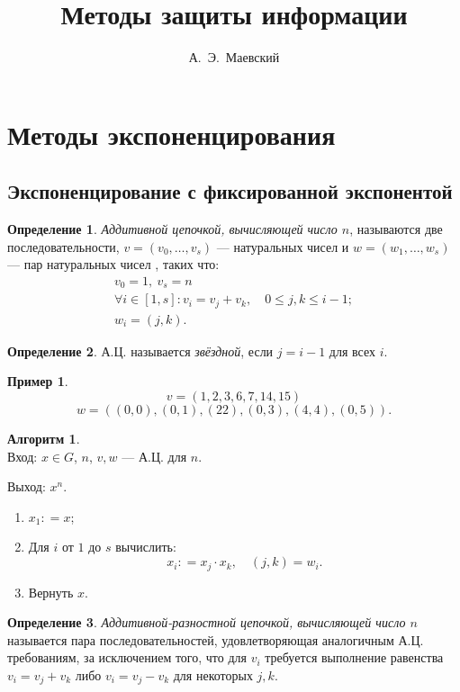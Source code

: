\documentclass[12pt]{article}%
\title{Методы защиты информации}
\author{А.~Э.~Маевский}
\date{}
\newcommand{\coleq}{\ensuremath{\mathrel{\mathop:}=}}
\newcommand{\nspace}{\hspace{0pt}}
\theoremstyle{remark}
\theoremstyle{definition}
\newtheorem{Ex}{Пример}
\newtheorem{NumAlgo}{Алгоритм}
\newtheorem{Def}{Определение}[section]
\begin{document}
\maketitle
\thispagestyle{fancy}

\section{Методы экспоненцирования}

\subsection{Экспоненцирование с фиксированной экспонентой}

\begin{Def}
\emph{Аддитивной цепочкой, вычисляющей число $n$}, называются две
последовательности, $v=(v_0,\ldots,v_s)$ — натуральных чисел и $w=(w_1, \ldots, w_s)$ — пар
натуральных чисел , таких что:
\begin{gather*}
v_0 = 1, \: v_s = n\\
\forall i \in [1, s]\colon v_i = v_j + v_k, \quad
0 \leqslant j, k \leqslant i-1;\\
 w_i = (j, k).
\end{gather*}
\end{Def}

\begin{Def}
А.Ц. называется \emph{звёздной}, если $j = i - 1$ для всех $i$.
\end{Def}

\begin{Ex}
$$v = (1, 2, 3, 6, 7, 14, 15)$$
$$w = ((0,0), (0,1), (22), (0,3), (4,4), (0,5)).$$
\end{Ex}

\begin{NumAlgo}\nspace\\Вход: $x \in G$, $n$, $v, w$ — А.Ц. для $n$.

Выход: $x^n$. 
\begin{enumerate}
  \item $x_1 \coleq x$;
  \item Для $i$ от $1$ до $s$ вычислить:
  $$x_i \coleq x_j \cdot x_k, \quad (j,k)=w_i.$$
  \item Вернуть $x$.    
\end{enumerate}
\end{NumAlgo}

\begin{Def}
\emph{Аддитивной-разностной цепочкой, вычисляющей число $n$} называется пара
последовательностей, удовлетворяющая аналогичным А.Ц. требованиям, за исключением того, что для $v_i$
требуется выполнение равенства $v_i = v_j + v_k$ либо $v_i = v_j - v_k$ для
некоторых $j, k$.
\end{Def}
\end{document}

